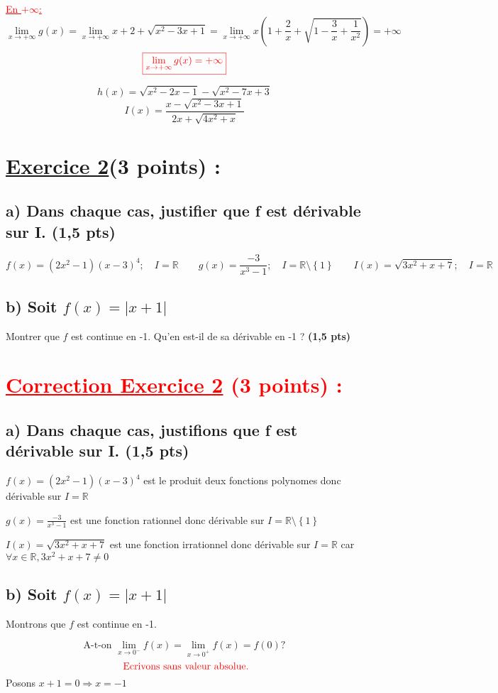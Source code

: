 \documentclass[12pt]{article}
\begin{document}
\textcolor{red}{\underline{En $+\infty$:}}
\[\lim_{x \to +\infty}g(x)=\lim_{x \to +\infty}x+2+\sqrt{x^{2}-3x+1}=\lim_{x \to +\infty}x\left(1+\frac{2}{x}+\sqrt{1-\frac{3}{x}+\frac{1}{x^{2}}}\right)=+\infty\] 
\[\textcolor{red}{\boxed{\lim_{x \to +\infty}g(x)=+\infty}}\]


\[h(x)=\sqrt{x^{2}-2x-1}-\sqrt{x^{2}-7x+3} \]
\[I(x)=\frac{x-\sqrt{x^{2}-3x+1}}{2x+\sqrt{4x^{2}+x}} \]
\section*{\underline{Exercice 2}(3 points) :}
\subsection*{a) Dans chaque cas, justifier que f est dérivable sur I. (1,5 pts)}
\[f(x)=(2x^{2}-1)(x-3)^{4};\quad I=\mathbb{R}\quad\quad g(x)=\frac{-3}{x^{3}-1};\quad I=\mathbb{R}\setminus\left\lbrace 1 \right\rbrace \quad\quad I(x)=\sqrt{3x^{2}+x+7};\quad I=\mathbb{R}\]
\subsection*{b) Soit $f(x)=|x+1|$ }
Montrer que $f$ est continue en -1. Qu'en est-il de sa dérivable en -1 ? \textbf{(1,5 pts)}
\section*{\textcolor{red}{\underline{Correction Exercice 2} (3 points) :}}
\subsection*{a) Dans chaque cas, justifions que f est dérivable sur I. (1,5 pts)}
$f(x)=(2x^{2}-1)(x-3)^{4}$ est le produit deux fonctions polynomes donc dérivable sur $I=\mathbb{R}$

$g(x)=\frac{-3}{x^{3}-1}$ est une fonction rationnel donc dérivable sur $I=\mathbb{R}\setminus\left\lbrace 1 \right\rbrace$

$I(x)=\sqrt{3x^{2}+x+7}$ est une fonction irrationnel donc dérivable sur $I=\mathbb{R}$ car\\ $\forall x\in \mathbb{R}, 3x^{2}+x+7\neq 0$
\subsection*{b) Soit $f(x)=|x+1|$ }
Montrons que $f$ est continue en -1.

\[\text{A-t-on }\lim_{x \to 0^{-}}f(x)=\lim_{x \to 0^{+}}f(x)=f(0)?\]
\[\textcolor{red}{\text{ Ecrivons sans valeur absolue.}}\]
Posons $x+1=0\Rightarrow x=-1$
\end{document}
